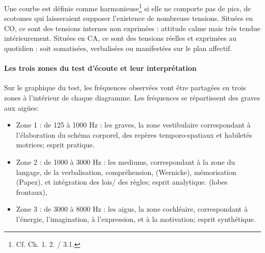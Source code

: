 Une courbe est définie comme harmonieuse\footnote{Cf. Ch. 1. 2. / 3.1.}
si elle ne comporte pas de
pics, de scotomes
qui laisseraient
supposer l'existence de nombreuse tensions.
Situées en CO, ce sont des tensions internes non exprimées : attitude
calme mais très tendue intérieurement.
Situées en CA, ce sont des tensions réelles et exprimées au quotidien
: soit somatisées, verbalisées ou manifestées sur le plan
affectif.

\paragraph{Les trois zones du test d'écoute et leur interprétation}
Sur le graphique du test, les fréquences observées vont être partagées en
trois zones à l\textquoteright intérieur
de chaque diagramme. Les fréquences se répartissent des
graves aux aigües:
\begin{itemize}
	\item Zone 1 : de 125 à 1000 Hz : les graves, la zone vestibulaire correspondant à l'élaboration
	du schéma corporel, des repères temporo-spatiaux et habiletés motrices; 
	esprit pratique.
	\item Zone 2 : de 1000 à 3000 Hz : les mediums, correspondant à  la zone du langage, de la
	verbalisation, compréhension, (Wernicke),
	mémorisation (Papez), 
	et intégration des lois/
	des règles; esprit analytique.
	(lobes frontaux),
	\item Zone 3 : de 3000 à 8000 Hz : les aigus, la zone cochléaire, correspondant à l'énergie,
	 l'imagination, à l'expression, et à la motivation; esprit synthétique.
	
\end{itemize}
 
